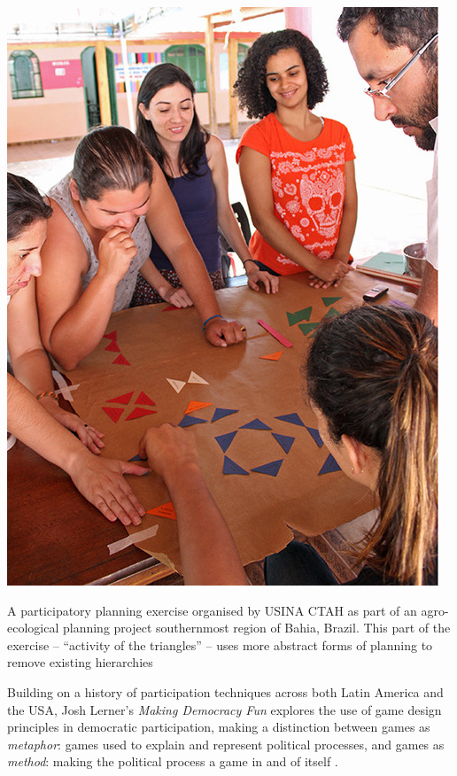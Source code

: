 \documentclass[nofonts,nols,justified,nobib]{tufte-book}
\begin{document}
\begin{marginfigure}
\includegraphics[width=\textwidth]{img/1/usina-triangles.jpg}
\caption{A participatory planning exercise organised by USINA CTAH as part of an agro-ecological planning project southernmost region of Bahia, Brazil. This part of the exercise -- ``activity of the triangles'' -- uses more abstract forms of planning to remove existing hierarchies  \cite{noauthor_usina_ctah_nodate}}
\end{marginfigure}

Building on a history of participation techniques across both Latin America and the USA, Josh Lerner's \emph{Making Democracy Fun} explores the use of game design principles in democratic participation, making a distinction between games as \emph{metaphor}: games used to explain and represent political processes, and games as \emph{method}: making the political process a game in and of itself \cite{lerner_making_2014}. %
\end{document}
